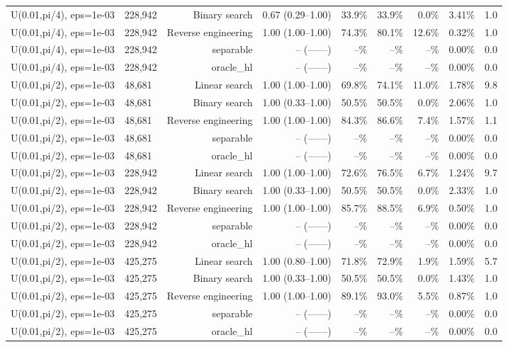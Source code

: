\begin{tabular}{llrrrrrrr}
U(0.01,pi/4), eps=1e-03 & 228,942 & Binary search & 0.67 (0.29--1.00) & 33.9\% & 33.9\% & 0.0\% & 3.41\% & 1.0 \\
U(0.01,pi/4), eps=1e-03 & 228,942 & Reverse engineering & 1.00 (1.00--1.00) & 74.3\% & 80.1\% & 12.6\% & 0.32\% & 1.0 \\
U(0.01,pi/4), eps=1e-03 & 228,942 & separable & -- (------) & --\% & --\% & --\% & 0.00\% & 0.0 \\
U(0.01,pi/4), eps=1e-03 & 228,942 & oracle_hl & -- (------) & --\% & --\% & --\% & 0.00\% & 0.0 \\
U(0.01,pi/2), eps=1e-03 & 48,681 & Linear search & 1.00 (1.00--1.00) & 69.8\% & 74.1\% & 11.0\% & 1.78\% & 9.8 \\
U(0.01,pi/2), eps=1e-03 & 48,681 & Binary search & 1.00 (0.33--1.00) & 50.5\% & 50.5\% & 0.0\% & 2.06\% & 1.0 \\
U(0.01,pi/2), eps=1e-03 & 48,681 & Reverse engineering & 1.00 (1.00--1.00) & 84.3\% & 86.6\% & 7.4\% & 1.57\% & 1.1 \\
U(0.01,pi/2), eps=1e-03 & 48,681 & separable & -- (------) & --\% & --\% & --\% & 0.00\% & 0.0 \\
U(0.01,pi/2), eps=1e-03 & 48,681 & oracle_hl & -- (------) & --\% & --\% & --\% & 0.00\% & 0.0 \\
U(0.01,pi/2), eps=1e-03 & 228,942 & Linear search & 1.00 (1.00--1.00) & 72.6\% & 76.5\% & 6.7\% & 1.24\% & 9.7 \\
U(0.01,pi/2), eps=1e-03 & 228,942 & Binary search & 1.00 (0.33--1.00) & 50.5\% & 50.5\% & 0.0\% & 2.33\% & 1.0 \\
U(0.01,pi/2), eps=1e-03 & 228,942 & Reverse engineering & 1.00 (1.00--1.00) & 85.7\% & 88.5\% & 6.9\% & 0.50\% & 1.0 \\
U(0.01,pi/2), eps=1e-03 & 228,942 & separable & -- (------) & --\% & --\% & --\% & 0.00\% & 0.0 \\
U(0.01,pi/2), eps=1e-03 & 228,942 & oracle_hl & -- (------) & --\% & --\% & --\% & 0.00\% & 0.0 \\
U(0.01,pi/2), eps=1e-03 & 425,275 & Linear search & 1.00 (0.80--1.00) & 71.8\% & 72.9\% & 1.9\% & 1.59\% & 5.7 \\
U(0.01,pi/2), eps=1e-03 & 425,275 & Binary search & 1.00 (0.33--1.00) & 50.5\% & 50.5\% & 0.0\% & 1.43\% & 1.0 \\
U(0.01,pi/2), eps=1e-03 & 425,275 & Reverse engineering & 1.00 (1.00--1.00) & 89.1\% & 93.0\% & 5.5\% & 0.87\% & 1.0 \\
U(0.01,pi/2), eps=1e-03 & 425,275 & separable & -- (------) & --\% & --\% & --\% & 0.00\% & 0.0 \\
U(0.01,pi/2), eps=1e-03 & 425,275 & oracle_hl & -- (------) & --\% & --\% & --\% & 0.00\% & 0.0 \\
\bottomrule
\end{tabular}
